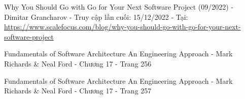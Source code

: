 \begin{thebibliography}{9}
    Why You Should Go with Go for Your Next Software Project (09/2022) - Dimitar Grancharov - Truy cập lần cuối: 15/12/2022 - Tại: \url{https://www.scalefocus.com/blog/why-you-should-go-with-go-for-your-next-software-project}

    Fundamentals of Software Architecture An Engineering Approach - Mark Richards \& Neal Ford - Chương 17 - Trang 256
    
    Fundamentals of Software Architecture An Engineering Approach - Mark Richards \& Neal Ford - Chương 17 - Trang 257

\end{thebibliography}